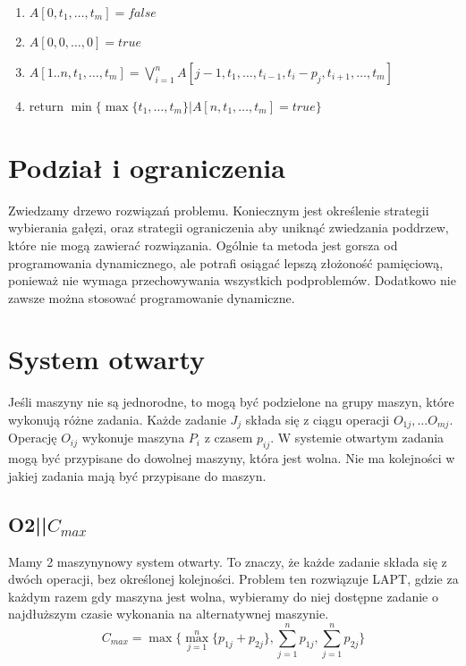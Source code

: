 \documentclass{../notatki}
\begin{document}
\begin{enumerate}
  \item $A[0, t_1, \dots, t_m] = false$
  \item $A[0, 0, \dots, 0] = true$
  \item $
    A[1..n, t_1, \dots, t_m] =
    \bigvee_{i=1}^{n} A[j - 1, t_1, \dots, t_{i - 1}, t_i - p_j, t_{i
    + 1}, \dots, t_m]
    $
  \item return $\min\{\max\{t_1, \dots, t_m\} | A[n, t_1, \dots, t_m] = true\}$
\end{enumerate}

\section{Podział i ograniczenia}

Zwiedzamy drzewo rozwiązań problemu. Koniecznym jest określenie strategii
wybierania gałęzi, oraz strategii ograniczenia aby uniknąć zwiedzania
poddrzew, które nie mogą zawierać rozwiązania. Ogólnie ta metoda jest gorsza od
programowania dynamicznego, ale potrafi osiągać lepszą złożoność
pamięciową, ponieważ nie wymaga przechowywania wszystkich podproblemów.
Dodatkowo nie zawsze można stosować programowanie dynamiczne.

\section{System otwarty}

Jeśli maszyny nie są jednorodne, to mogą być podzielone na grupy maszyn, które
wykonują różne zadania. Każde zadanie $J_j$ składa się z ciągu
operacji $O_{1j}, \dots O_{mj}$. Operację $O_{ij}$ wykonuje maszyna
$P_i$ z czasem $p_{ij}$. W systemie otwartym zadania mogą być przypisane
do dowolnej maszyny, która jest wolna. Nie ma kolejności w jakiej zadania
mają być przypisane do maszyn.

\subsection{O2||\texorpdfstring{$C_{max}$}{Cmax}}

Mamy 2 maszynynowy system otwarty. To znaczy, że każde zadanie składa się
z dwóch operacji, bez określonej kolejności. Problem ten rozwiązuje
LAPT, gdzie za każdym razem gdy maszyna jest wolna, wybieramy do niej
dostępne zadanie o najdłuższym czasie wykonania na alternatywnej maszynie.
$$
C_{max} = \max\{\max_{j=1}^{n}\{p_{1j} + p_{2j}\},
\sum_{j=1}^{n}p_{1j}, \sum_{j=1}^{n} p_{2j}\}
$$
\end{document}
